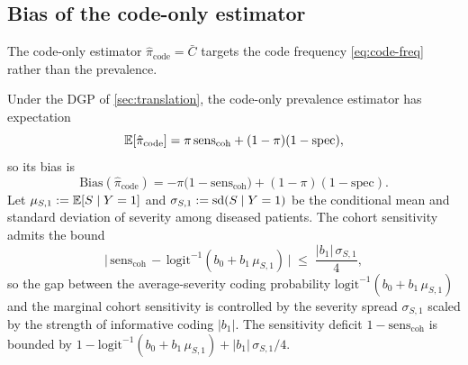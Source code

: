 \subsection{Bias of the code-only estimator}

The code-only estimator $\hat\pi_{\text{code}} = \bar{C}$ targets the
code frequency \eqref{eq:code-freq} rather than the prevalence.

\begin{theorem}
\label{thm:bias-informative}
Under the DGP of \cref{sec:translation}, the code-only prevalence
estimator has expectation
\begin{equation}
  \mathbb{E}[\hat\pi_{\text{code}}]
    = \pi\,\mathrm{sens}_{\text{coh}}
      + (1 - \pi)(1 - \mathrm{spec}),
  \label{eq:meth-codebias}
\end{equation}
so its bias is
\begin{equation}
  \mathrm{Bias}(\hat\pi_{\text{code}})
    = -\pi\big(1 - \mathrm{sens}_{\text{coh}}\big)
      + (1 - \pi)(1 - \mathrm{spec}).
  \label{eq:meth-codebias2}
\end{equation}
Let $\mu_{S,1} := \mathbb{E}[S \mid Y = 1]$ and $\sigma_{S,1} := \mathrm{sd}(S
\mid Y = 1)$ be the conditional mean and standard deviation of
severity among diseased patients. The cohort sensitivity admits the
bound
\begin{equation}
  \big|\,\mathrm{sens}_{\text{coh}} \,-\, \mathrm{logit}^{-1}(b_0 + b_1\,\mu_{S,1})\,\big|
    \;\le\; \frac{|b_1|\,\sigma_{S,1}}{4},
  \label{eq:meth-bound}
\end{equation}
so the gap between the average-severity coding probability
$\mathrm{logit}^{-1}(b_0 + b_1\,\mu_{S,1})$ and the marginal cohort
sensitivity is controlled by the severity spread $\sigma_{S,1}$ scaled
by the strength of informative coding $|b_1|$. The sensitivity deficit
$1 - \mathrm{sens}_{\text{coh}}$ is bounded by $1 -
\mathrm{logit}^{-1}(b_0 + b_1\,\mu_{S,1}) + |b_1|\,\sigma_{S,1}/4$.
\end{theorem}

